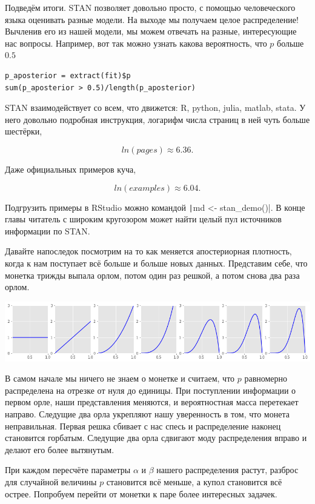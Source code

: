 \documentclass[12pt, a4paper, oneside]{extreport}
\theoremstyle{plain}              %
\theoremstyle{definition}         %
\begin{document}
Подведём итоги. STAN позволяет довольно просто, с помощью человеческого языка оценивать разные модели. На выходе мы получаем целое распределение! Вычленив его из нашей модели, мы можем отвечать на разные, интересующие нас вопросы. Например, вот так можно узнать какова вероятность, что $p$ больше $0.5$

\begin{verbatim}
p_aposterior = extract(fit)$p
sum(p_aposterior > 0.5)/length(p_aposterior)
\end{verbatim}

STAN взаимодействует со всем, что движется: R, python, julia, matlab, stata. У него довольно подробная инструкция, логарифм числа страниц в ней чуть больше шестёрки, 

\[ln(pages) \approx 6.36.\]

Даже официальных примеров куча, 

\[ln(examples) \approx 6.04.\] 

 Подгрузить примеры в RStudio можно командой \texttt|md <- stan_demo()|.  В конце главы читатель с широким кругозором может найти целый пул  источников информации по STAN. 

Давайте напоследок посмотрим на то как меняется апостериорная плотность, когда к нам поступает всё больше и больше новых данных.  Представим себе, что монетка трижды выпала орлом, потом один раз решкой, а потом снова два раза орлом.  

\begin{center}
\includegraphics[scale=0.45]{beta_coin_evol.png}
\end{center}

В самом начале мы ничего не знаем о монетке и считаем, что $p$ равномерно распределена на отрезке от нуля до единицы. При поступлении информации о первом орле, наши представления меняются, и вероятностная масса перетекает направо. Следущие два орла укрепляют нашу уверенность в том, что монета неправильная. Первая решка сбивает с нас спесь и распределение наконец становится горбатым.  Следущие два орла сдвигают моду распределения вправо и делают его более вытянутым. 

При каждом пересчёте параметры $\alpha$ и $\beta$ нашего распределения растут, разброс для случайной величины $p$ становится всё меньше, а купол становится всё острее.  Попробуем перейти от монетки к паре более интересных задачек. 
\end{document}
